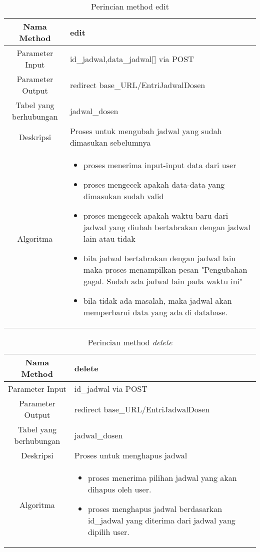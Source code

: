 \begin{center}
\begin{table}[H]
\begin{tabular}{|c|p{11cm}|}
\hline
Nama Method 	& 	edit 	\\
\hline
Parameter Input & id\_jadwal,data\_jadwal[] via POST \\
\hline
Parameter Output & redirect base\_URL/EntriJadwalDosen \\
\hline
Tabel yang berhubungan & jadwal\_dosen \\
\hline
Deskripsi	& Proses untuk mengubah jadwal yang sudah dimasukan sebelumnya \\
\hline
Algoritma	& \begin{itemize}
				\item proses menerima input-input data dari user
				\item proses mengecek apakah data-data yang dimasukan sudah valid
				\item proses mengecek apakah waktu baru dari jadwal yang diubah bertabrakan dengan jadwal lain atau tidak
				\item bila jadwal bertabrakan dengan jadwal lain maka proses menampilkan pesan "Pengubahan gagal. Sudah ada jadwal lain pada waktu ini"
				\item bila tidak ada masalah, maka jadwal akan memperbarui data yang ada di database.
				\end{itemize} \\
\hline
\end{tabular}
\caption{Perincian method edit}
\end{table}
\end{center}

\begin{center}
\begin{table}[H]
\begin{tabular}{|c|p{11cm}|}
\hline
Nama Method 	& 	delete 	\\
\hline
Parameter Input & id\_jadwal via POST \\
\hline
Parameter Output & redirect base\_URL/EntriJadwalDosen \\
\hline
Tabel yang berhubungan & jadwal\_dosen \\
\hline
Deskripsi	& Proses untuk menghapus jadwal \\
\hline
Algoritma	& \begin{itemize}
				\item proses menerima pilihan jadwal yang akan dihapus oleh user.
				\item proses menghapus jadwal berdasarkan id\_jadwal yang diterima dari jadwal yang dipilih user.
				\end{itemize} \\
\hline
\end{tabular}
\caption{Perincian method \textit{delete}}
\end{table}
\end{center}


